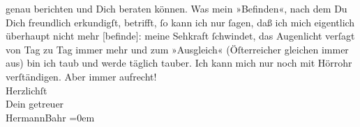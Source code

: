 \begin{ledgroupsized}[t]{13cm}
               genau berichten und Dich beraten können.\pend
           \pstart
           Was mein »Befinden«, nach dem Du Dich freundlich erkundigſt, betrifft, ſo kann ich
               nur ſagen, daß ich mich eigentlich überhaupt nicht {\pb}mehr {[}befinde{]}: meine Sehkraft ſchwindet, das Augenlicht verſagt
               von Tag zu Tag immer mehr und zum »Ausgleich« (Öſterreicher gleichen immer aus) bin ich taub und werde täglich tauber. Ich
               kann mich nur noch mit Hörrohr verſtändigen.\pend
           \pstart
           Aber immer aufrecht!{\\[\baselineskip]}Herzlichſt{\\[\baselineskip]}Dein getreuer{\\[\baselineskip]}\spacefill\mbox{HermannBahr}\pend
           \leftskip=0em{}
         
         \endnumbering{}\end{ledgroupsized}  \newcommand{\dateiname}{L02547}\newcommand{\titel}{Hermann Bahr an Arthur Schnitzler, 7. 9. 1931}\newcommand{\editorInnen}{ Kurt Ifkovits,  Martin Anton Müller}
      